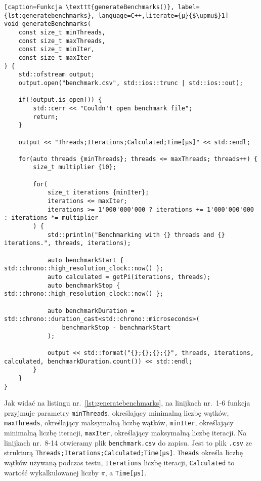 \begin{lstlisting}[caption=Funkcja \texttt{generateBenchmarks()}, label={lst:generatebenchmarks}, language=C++,literate={µ}{$\upmu$}1]
void generateBenchmarks(
	const size_t minThreads,
	const size_t maxThreads,
	const size_t minIter,
	const size_t maxIter
) {
	std::ofstream output;
	output.open("benchmark.csv", std::ios::trunc | std::ios::out);
	
	if(!output.is_open()) {
		std::cerr << "Couldn't open benchmark file";
		return;
	}

	output << "Threads;Iterations;Calculated;Time[µs]" << std::endl;

	for(auto threads {minThreads}; threads <= maxThreads; threads++) {
		size_t multiplier {10};

		for(
			size_t iterations {minIter};
			iterations <= maxIter;
			iterations >= 1'000'000'000 ? iterations += 1'000'000'000 : iterations *= multiplier
		) {
			std::println("Benchmarking with {} threads and {} iterations.", threads, iterations);

			auto benchmarkStart { std::chrono::high_resolution_clock::now() };
			auto calculated = getPi(iterations, threads);
			auto benchmarkStop { std::chrono::high_resolution_clock::now() };

			auto benchmarkDuration = std::chrono::duration_cast<std::chrono::microseconds>(
				benchmarkStop - benchmarkStart
			);

			output << std::format("{};{};{};{}", threads, iterations, calculated, benchmarkDuration.count()) << std::endl;
		}
	}
}
\end{lstlisting}
Jak widać na listingu nr.~\ref{lst:generatebenchmarks}, na linijkach nr.~1-6 funkcja przyjmuje parametry \texttt{minThreads}, określający minimalną liczbę wątków, \texttt{maxThreads}, określający maksymalną liczbę wątków, \texttt{minIter}, określający minimalną liczbę iteracji, \texttt{maxIter}, określający maksymalną liczbę iteracji. Na linijkach nr.~8-14 otwieramy plik \texttt{benchmark.csv} do zapisu. Jest to plik \texttt{.csv} ze strukturą \texttt{Threads;Iterations;Calculated;Time[µs]}. \texttt{Theads} określa liczbę wątków używaną podczas testu, \texttt{Iterations} liczbę iteracji, \texttt{Calculated} to wartość wykalkulowanej liczby $\pi$, a \texttt{Time[µs]}. 

